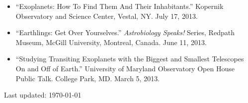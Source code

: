 \documentclass[margin]{res}
\begin{document}
\begin{resume}
\begin{itemize}
\item ``Exoplanets: How To Find Them And Their Inhabitants.'' Kopernik Observatory and Science Center, Vestal, NY. July 17, 2013. 

\item ``Earthlings: Get Over Yourselves.'' \textit{Astrobiology Speaks!} Series, Redpath Museum, McGill University, Montreal, Canada. June 11, 2013.

\item ``Studying Transiting Exoplanets with the Biggest and Smallest Telescopes On and Off of Earth.'' University of Maryland Observatory Open House Public Talk. College Park, MD. March 5, 2013.
\end{itemize}
            
\vfill \hfill {\small Last updated: \today}
\end{resume}
\end{document}
